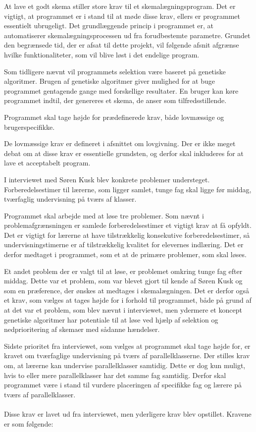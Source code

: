 At lave et godt skema stiller store krav til et skemalægningsprogram. Det er vigtigt, at programmet er i stand til at møde disse krav, ellers er programmet essentielt ubrugeligt. Det grundlæggende princip i programmet er, at automatiserer skemalægningsprocessen ud fra forudbestemte parametre. Grundet den begrænsede tid, der er afsat til dette projekt, vil følgende afsnit afgrænse hvilke funktionaliteter, som vil blive løst i det endelige program.

Som tidligere nævnt vil programmets selektion være baseret på genetiske algoritmer. Brugen af genetiske algoritmer giver mulighed for at buge programmet gentagende gange med forskellige resultater. En bruger kan køre programmet indtil, der genereres et skema, de anser som tilfredsstillende.

Programmet skal tage højde for prædefinerede krav, både lovmæssige og brugerspecifikke.

De lovmæssige krav er defineret i afsnittet om lovgivning. Der er ikke meget debat om at disse krav er essentielle grundsten, og derfor skal inkluderes for at lave et acceptabelt program. 

I interviewet med Søren Kusk blev konkrete problemer understeget. Forberedelsestimer til lærerne, som ligger samlet, tunge fag skal ligge før middag, tværfaglig undervisning på tværs af klasser.

Programmet skal arbejde med at løse tre problemer. Som nævnt i problemafgrænsningen er samlede forberedelsestimer et vigtigt krav at få opfyldt. Det er vigtigt for lærerne at have tilstrækkelig konsekutive forberedelsestimer, så undervisningstimerne er af tilstrækkelig kvalitet for elevernes indlæring. Det er derfor medtaget i programmet, som et at de primære problemer, som skal løses. 

Et andet problem der er valgt til at løse, er problemet omkring tunge fag efter middag. Dette var et problem, som var blevet gjort til kende af Søren Kusk og som en præference, der ønskes at medtages i skemalægningen. Det er derfor også et krav, som vælges at tages højde for i forhold til programmet, både på grund af at det var et problem, som blev nævnt i interviewet, men ydermere et koncept genetiske algoritmer har potentiale til at løse ved hjælp af selektion og nedprioritering af skemaer med sådanne hændelser.

Sidste prioritet fra interviewet, som vælges at programmet skal tage højde for, er kravet om tværfaglige undervisning på tværs af parallelklasserne. Der stilles krav om, at lærerne kan undervise parallelklasser samtidig. Dette er dog kun muligt, hvis to eller mere parallelklasser har det samme fag samtidig. Derfor skal programmet være i stand til vurdere placeringen af specifikke fag og lærere på tværs af parallelklasser. 
\\\\
Disse krav er lavet ud fra interviewet, men yderligere krav blev opstillet. Kravene er som følgende:

